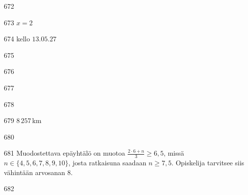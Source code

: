 \begin{Vastaus}{672}
    
\end{Vastaus}
\begin{Vastaus}{673}
		$x=2$
    
\end{Vastaus}
\begin{Vastaus}{674}
		kello $13.05.27$
    
\end{Vastaus}
\begin{Vastaus}{675}
    
\end{Vastaus}
\begin{Vastaus}{676}

	
\end{Vastaus}
\begin{Vastaus}{677}
    
\end{Vastaus}
\begin{Vastaus}{678}
	
\end{Vastaus}
\begin{Vastaus}{679}
        $8\,257$\,km
    
\end{Vastaus}
\begin{Vastaus}{680}
    
\end{Vastaus}
\begin{Vastaus}{681}
Muodostettava epäyhtälö on muotoa $\frac{2\cdot 6+n}{3}\geq 6,5$, missä $n \in \lbrace 4,5,6,7,8,9,10 \rbrace$, josta ratkaisuna saadaan $n\geq 7,5$. Opiskelija tarvitsee siis vähintään arvosanan $8$.
\end{Vastaus}
\begin{Vastaus}{682}
  
\end{Vastaus}
